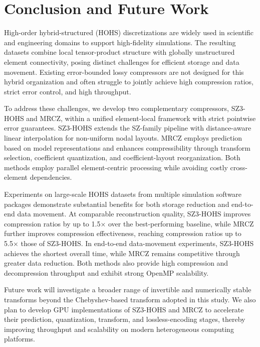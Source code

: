 
\section{Conclusion and Future Work}\label{sec:conclusion}

High-order hybrid-structured (HOHS) discretizations are widely used in scientific and engineering domains to support high-fidelity simulations. The resulting datasets combine local tensor-product structure with globally unstructured element connectivity, posing distinct challenges for efficient storage and data movement. Existing error-bounded lossy compressors are not designed for this hybrid organization and often struggle to jointly achieve high compression ratios, strict error control, and high throughput.

To address these challenges, we develop two complementary compressors, SZ3-HOHS and MRCZ, within a unified element-local framework with strict pointwise error guarantees. SZ3-HOHS extends the SZ-family pipeline with distance-aware linear interpolation for non-uniform nodal layouts. MRCZ employs prediction based on model representations and enhances compressibility through transform selection, coefficient quantization, and coefficient-layout reorganization. Both methods employ parallel element-centric processing while avoiding costly cross-element dependencies.

Experiments on large-scale HOHS datasets from multiple simulation software packages demonstrate substantial benefits for both storage reduction and end-to-end data movement. At comparable reconstruction quality, SZ3-HOHS improves compression ratios by up to 1.5× over the best-performing baseline, while MRCZ further improves compression effectiveness, reaching compression ratios up to 5.5× those of SZ3-HOHS. In end-to-end data-movement experiments, SZ3-HOHS achieves the shortest overall time, while MRCZ remains competitive through greater data reduction. Both methods also provide high compression and decompression throughput and exhibit strong OpenMP scalability.


Future work will investigate a broader range of invertible and numerically stable transforms beyond the Chebyshev-based transform adopted in this study. We also plan to develop GPU implementations of SZ3-HOHS and MRCZ to accelerate their prediction, quantization, transform, and lossless-encoding stages, thereby improving throughput and scalability on modern heterogeneous computing platforms.